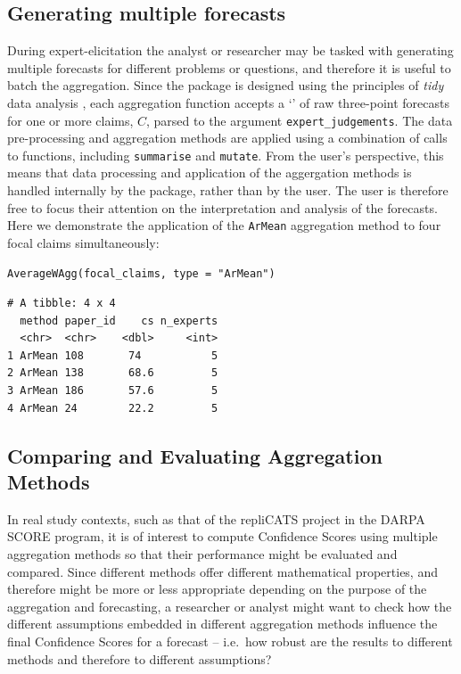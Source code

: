 \documentclass[article]{jss}
\newcommand{\class}[1]{`\code{#1}'}
\begin{document}
\hypertarget{generating-multiple-forecasts}{%
\subsection{Generating multiple
forecasts}\label{generating-multiple-forecasts}}

During expert-elicitation the analyst or researcher may be tasked with
generating multiple forecasts for different problems or questions, and
therefore it is useful to batch the aggregation. Since the
 package is designed using the principles of \emph{tidy}
data analysis \citep{tidyverse2019}, each aggregation function accepts a
\class{data.frame} of raw three-point forecasts for one or more claims,
\(C\), parsed to the argument \texttt{expert\_judgements}. The data
pre-processing and aggregation methods are applied using a combination
of calls to  functions, including \texttt{summarise} and
\texttt{mutate}. From the user's perspective, this means that data
processing and application of the aggergation methods is handled
internally by the  package, rather than by the user. The
user is therefore free to focus their attention on the interpretation
and analysis of the forecasts. Here we demonstrate the application of
the \texttt{ArMean} aggregation method to four focal claims
simultaneously:

\begin{verbatim}
AverageWAgg(focal_claims, type = "ArMean")
\end{verbatim}

\begin{verbatim}
# A tibble: 4 x 4
  method paper_id    cs n_experts
  <chr>  <chr>    <dbl>     <int>
1 ArMean 108       74           5
2 ArMean 138       68.6         5
3 ArMean 186       57.6         5
4 ArMean 24        22.2         5
\end{verbatim}

\hypertarget{comparing-and-evaluating-aggregation-methods}{%
\subsection{Comparing and Evaluating Aggregation
Methods}\label{comparing-and-evaluating-aggregation-methods}}

In real study contexts, such as that of the repliCATS project in the
DARPA SCORE program, it is of interest to compute Confidence Scores
using multiple aggregation methods so that their performance might be
evaluated and compared. Since different methods offer different
mathematical properties, and therefore might be more or less appropriate
depending on the purpose of the aggregation and forecasting, a
researcher or analyst might want to check how the different assumptions
embedded in different aggregation methods influence the final Confidence
Scores for a forecast -- i.e.~how robust are the results to different
methods and therefore to different assumptions?
\end{document}

